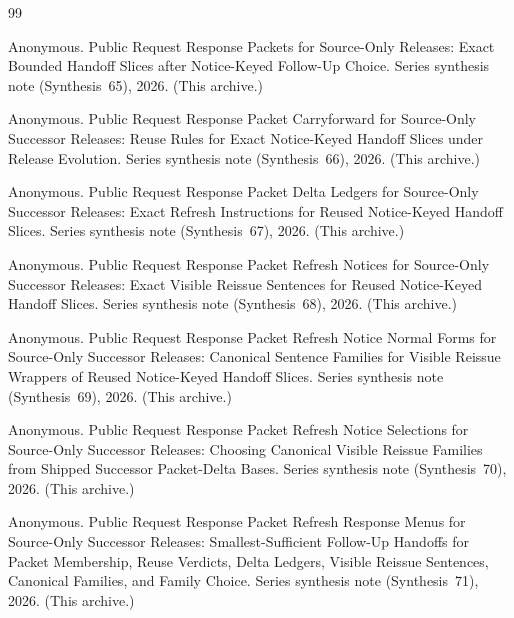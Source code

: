 \documentclass[11pt]{article}
\begin{document}
\begin{thebibliography}{99}\small

Anonymous.
\newblock Public Request Response Packets for Source-Only Releases: Exact Bounded Handoff Slices after Notice-Keyed Follow-Up Choice.
\newblock Series synthesis note (Synthesis~65), 2026. (This archive.)

Anonymous.
\newblock Public Request Response Packet Carryforward for Source-Only Successor Releases: Reuse Rules for Exact Notice-Keyed Handoff Slices under Release Evolution.
\newblock Series synthesis note (Synthesis~66), 2026. (This archive.)

Anonymous.
\newblock Public Request Response Packet Delta Ledgers for Source-Only Successor Releases: Exact Refresh Instructions for Reused Notice-Keyed Handoff Slices.
\newblock Series synthesis note (Synthesis~67), 2026. (This archive.)

Anonymous.
\newblock Public Request Response Packet Refresh Notices for Source-Only Successor Releases: Exact Visible Reissue Sentences for Reused Notice-Keyed Handoff Slices.
\newblock Series synthesis note (Synthesis~68), 2026. (This archive.)

Anonymous.
\newblock Public Request Response Packet Refresh Notice Normal Forms for Source-Only Successor Releases: Canonical Sentence Families for Visible Reissue Wrappers of Reused Notice-Keyed Handoff Slices.
\newblock Series synthesis note (Synthesis~69), 2026. (This archive.)

Anonymous.
\newblock Public Request Response Packet Refresh Notice Selections for Source-Only Successor Releases: Choosing Canonical Visible Reissue Families from Shipped Successor Packet-Delta Bases.
\newblock Series synthesis note (Synthesis~70), 2026. (This archive.)

Anonymous.
\newblock Public Request Response Packet Refresh Response Menus for Source-Only Successor Releases: Smallest-Sufficient Follow-Up Handoffs for Packet Membership, Reuse Verdicts, Delta Ledgers, Visible Reissue Sentences, Canonical Families, and Family Choice.
\newblock Series synthesis note (Synthesis~71), 2026. (This archive.)



\end{thebibliography}
\end{document}
